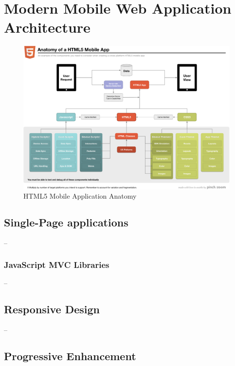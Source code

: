 \section{Modern Mobile Web Application Architecture}
\label{section:modern-mobile-web}

\begin{figure}[ht]
  \includegraphics[width=\textwidth]{images/anatomy-of-a-html5-mobile-app.png}
  \caption{HTML5 Mobile Application Anatomy \citationneeded}
  \label{figure:anatomy-of-a-html5-mobile-app.png}
\end{figure}

\subsection{Single-Page applications}

--

\subsubsection{JavaScript MVC Libraries}

--

\subsection{Responsive Design}

--

\subsection{Progressive Enhancement}
\label{subsection:progressive-enhancement}

